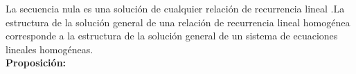 %	
%
%
%
La secuencia nula es una solución de cualquier relación de recurrencia lineal .La estructura de la solución general de una relación de recurrencia lineal homogénea corresponde a la estructura de la solución general de un sistema de ecuaciones lineales homogéneas.\\
{\bf Proposición:}
